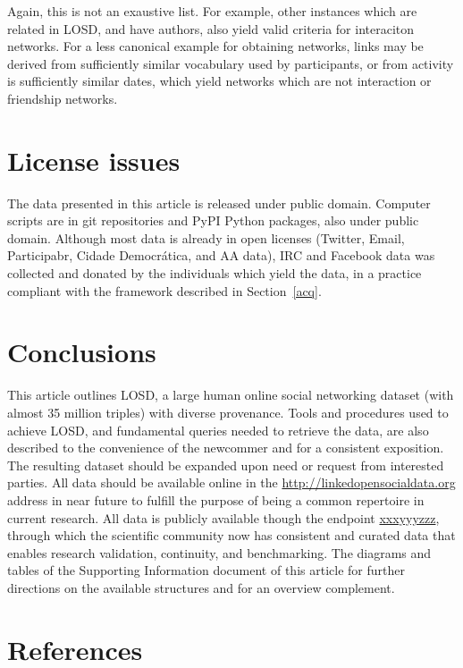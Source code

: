 \documentclass[review]{elsarticle}
\begin{document}
Again, this is not an exaustive list.
For example, other instances which are related in LOSD, and have authors,
also yield valid criteria for interaciton networks.
For a less canonical example for obtaining networks, links may be derived from sufficiently similar vocabulary used by participants, or from activity is sufficiently similar dates, which yield networks which are not interaction or friendship networks.

\section{License issues}
The data presented in this article is released under public domain.
Computer scripts are in git repositories and PyPI Python packages, also under public domain.
Although most data is already in open licenses (Twitter, Email, Participabr, Cidade Democrática, and AA data), IRC and Facebook data was collected
and donated by the individuals which yield the data, in a practice compliant with the framework described in Section~\ref{acq}.
\section{Conclusions}
\label{conclusions}
This article outlines LOSD, a large human online social networking dataset (with almost 35 million triples) with diverse provenance.
Tools and procedures used to achieve LOSD, and fundamental queries needed to retrieve the data, are also described to the convenience of the newcommer
and for a consistent exposition.
The resulting dataset should be expanded upon need or request from interested parties.
All data should be available online in the \url{http://linkedopensocialdata.org}
address in near future to fulfill the purpose of being a common
repertoire in current research.
All data is publicly available though the endpoint \url{xxxyyyzzz},
through which the scientific community now has consistent and curated data
that enables research validation, continuity, and benchmarking.
The diagrams and tables of the Supporting Information document of this article
for further directions
on the available structures and for an overview complement.


\section*{References}
%
% 

%
%
\end{document}
